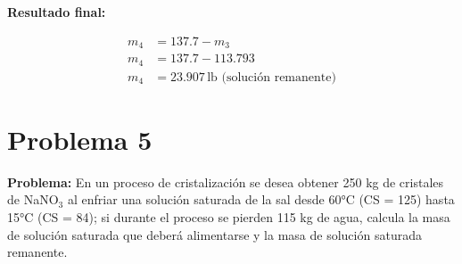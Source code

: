 \documentclass{article} %
\begin{document}
\begin{multicols}{2}
\textbf{Resultado final:}

\begin{align*}
    m_4 &= 137.7 - m_3 \\[10pt]
    m_4 &= 137.7 - 113.793 \\[10pt]
    m_4 &= 23.907 \, \text{lb (solución remanente)}
\end{align*}
\end{multicols} %


\newpage %
\section*{Problema 5} %
\textbf{Problema:} En un proceso de cristalización se desea obtener 250 kg de cristales de NaNO$_3$ al enfriar una solución saturada de la sal desde 60°C (CS = 125) hasta 15°C (CS = 84); si durante el proceso se pierden 115 kg de agua, calcula la masa de solución saturada que deberá alimentarse y la masa de solución saturada remanente.
\end{document}
